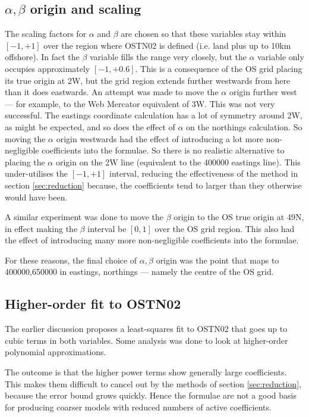 \documentclass[10pt,a4paper]{article}
\begin{document}
\subsection*{$\alpha,\beta$ origin and scaling}
\label{sec:ab_orig}
The scaling factors for $\alpha$ and $\beta$ are chosen so that these variables
stay within $[-1,+1]$ over the region where OSTN02 is defined (i.e. land plus
up to 10km offshore).  In fact the $\beta$ variable fills the range very
closely, but the $\alpha$ variable only occupies approximately $[-1,+0.6]$.
This is a consequence of the OS grid placing its true origin at 2\degree{}W,
but the grid region extends further westwards from here than it does eastwards.
An attempt was made to move the $\alpha$ origin further west --- for example,
to the Web Mercator equivalent of 3\degree{}W.  This was not very successful.
The eastings coordinate calculation has a lot of symmetry around 2\degree{}W,
as might be expected, and so does the effect of $\alpha$ on the northings
calculation.  So moving the $\alpha$ origin westwards had the effect of
introducing a lot more non-negligible coefficients into the formulae.  So there
is no realistic alternative to placing the $\alpha$ origin on the 2\degree{}W
line (equivalent to the 400000 eastings line).  This under-utilises the
$[-1,+1]$ interval, reducing the effectiveness of the method in section
\ref{sec:reduction} because, the coefficients tend to larger than they
otherwise would have been.

A similar experiment was done to move the $\beta$ origin to the OS true origin
at 49\degree{}N, in effect making the $\beta$ interval be $[0,1]$ over the OS
grid region.  This also had the effect of introducing many more non-negligible
coefficients into the formulae.

For these reasons, the final choice of $\alpha,\beta$ origin was the point that
maps to 400000,650000 in eastings, northings --- namely the centre of the OS
grid.

\subsection*{Higher-order fit to OSTN02}
The earlier discussion proposes a least-squares fit to OSTN02 that goes up to
cubic terms in both variables.  Some analysis was done to look at higher-order
polynomial approximations.

The outcome is that the higher power terms show generally large coefficients.
This makes them difficult to cancel out by the methods of section
\ref{sec:reduction}, because the error bound grows quickly.  Hence the formulae
are not a good basis for producing coarser models with reduced numbers of
active coefficients.
\end{document}
